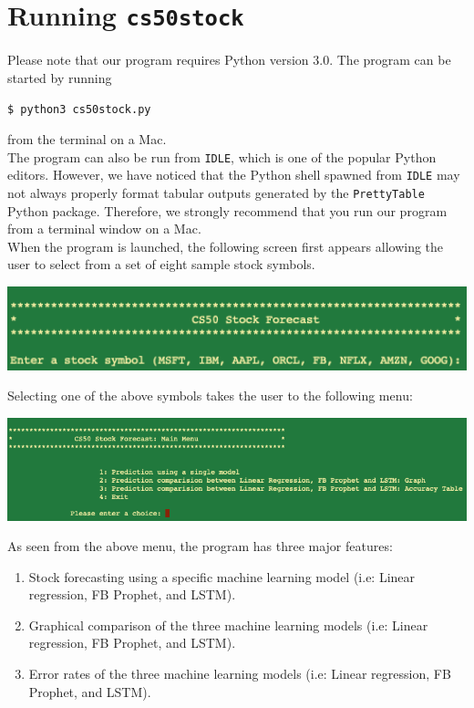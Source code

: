 \documentclass[12pt, oneside]{article}   	%
\begin{document}
\section{Running {\tt cs50stock}}

Please note that our program requires Python version 3.0. The program can be started by running \\

\centerline{\tt \$ python3 cs50stock.py} 

\vspace{0.2in}
\noindent
from the terminal on a Mac. \\


\noindent
The program can also be run from {\tt IDLE}, which is one of the popular Python editors. However, we have noticed that the Python shell spawned from {\tt IDLE} may not always properly format tabular outputs generated by the {\tt PrettyTable} Python package. Therefore, we strongly recommend that you run our program from a terminal window on a Mac.\\

\noindent
When the program is launched, the following screen first appears allowing the user to select from a set of eight sample stock symbols.\\

\centerline{\includegraphics[width=5.5in]{1.png}}

\vspace{0.2in}
\noindent
Selecting one of the above symbols takes the user to the following menu:\\

\centerline{\includegraphics[width=6.5in]{2.png}}

\vspace*{0.2in}

\noindent
As seen from the above menu, the program has three major features:

\begin{enumerate}
\item Stock forecasting using a specific machine learning model (i.e: Linear regression, FB Prophet, and LSTM).
\item Graphical comparison of the three machine learning models (i.e: Linear regression, FB Prophet, and LSTM).
\item Error rates of the three machine learning models (i.e: Linear regression, FB Prophet, and LSTM).
\end{enumerate}
\end{document}
